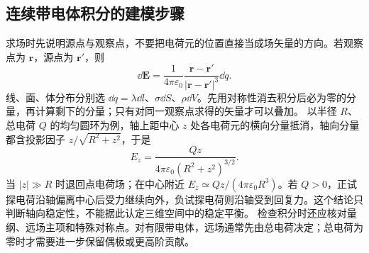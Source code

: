 \subsection{连续带电体积分的建模步骤}
求场时先说明源点与观察点，不要把电荷元的位置直接当成场矢量的方向。若观察点为 $\boldsymbol r$，源点为 $\boldsymbol r'$，则
\[
 \dd\boldsymbol E=\frac{1}{4\pi\varepsilon_0}
 \frac{\boldsymbol r-\boldsymbol r'}{|\boldsymbol r-\boldsymbol r'|^3}\dd q.
\]
线、面、体分布分别选 $\dd q=\lambda\dd l$、$\sigma\dd S$、$\rho\dd V$。先用对称性消去积分后必为零的分量，再计算剩下的分量；只有对同一观察点求得的矢量才可以叠加。
以半径 $R$、总电荷 $Q$ 的均匀圆环为例，轴上距中心 $z$ 处各电荷元的横向分量抵消，轴向分量都含投影因子 $z/\sqrt{R^2+z^2}$，于是
\[
 E_z=\frac{Qz}{4\pi\varepsilon_0(R^2+z^2)^{3/2}}.
\]
当 $|z|\gg R$ 时退回点电荷场；在中心附近 $E_z\simeq Qz/(4\pi\varepsilon_0R^3)$。若 $Q>0$，正试探电荷沿轴偏离中心后受力继续向外，负试探电荷则沿轴受到回复力。这个结论只判断轴向稳定性，不能据此认定三维空间中的稳定平衡。
检查积分时还应核对量纲、远场主项和特殊对称点。对有限带电体，远场通常先由总电荷决定；总电荷为零时才需要进一步保留偶极或更高阶贡献。

